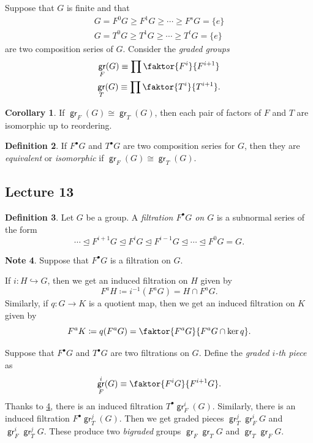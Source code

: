 \documentclass[10pt,letterpaper,cm]{nupset}
\theoremstyle{definition}
\newtheorem{definition}{Definition}[subsection]
\newtheorem{note}[definition]{Note}
\theoremstyle{theorem}
\newtheorem{corollary}[definition]{Corollary}
\theoremstyle{remark}
\newcommand{\1}{\mathbf{1}}
\newcommand{\0}{\vec 0}
\DeclareMathOperator{\gr}{\mathsf{gr}}
\begin{document}
\smallskip

Suppose that $G$ is finite and that 
\begin{gather*}
G = F^0G \geq F^1G \geq \cdots \geq F^sG = \{e\}  
\\ G = T^0G \geq T^1G \geq \cdots \geq T^tG = \{e\}
\end{gather*}
are two composition series of $G$. Consider the \textit{graded groups} 
\begin{gather*}
\gr_F(G) \equiv \prod \faktor{F^i}{F^{i+1}}
\\ \gr_T(G) \equiv \prod \faktor{T^i}{T^{i+1}}.
\end{gather*}

\begin{corollary}
 If $\gr_F(G) \cong \gr_T(G)$, then each pair of factors of $F$ and $T$ are isomorphic up to reordering. 
\end{corollary}

\begin{definition}
If $F^{\bullet}G$ and $T^{\bullet}G$ are two composition series for $G$, then they are \textit{equivalent} or \textit{isomorphic} if $\gr_F(G) \cong \gr_T(G)$.
\end{definition}

\subsection{Lecture 13}

\begin{definition}
Let $G$ be a group. A \textit{filtration $F^{\bullet}{G}$ on $G$} is a subnormal series of the form
\[
\cdots \unlhd F^{i+1}{G} \unlhd F^i{G} \unlhd F^{i-1}{G} \unlhd \cdots \unlhd F^0{G} = G
.\]
\end{definition}

\begin{note}\label{filt} Suppose that $F^{\bullet}G$ is a filtration on $G$.
\item If $i : H \hookrightarrow G$, then we get an induced filtration on $H$ given by $$F^a{H}\coloneqq  i^{-1}(F^aG) = H \cap F^a{G}.$$  Similarly, if $q: G \to K$ is a quotient map, then we get an induced filtration on $K$ given by $$F^aK\coloneqq  q(F^aG) = \faktor{F^aG}{F^aG \cap \ker{q}}.$$
\end{note}


Suppose that $F^{\bullet}G$ and $T^{\bullet}G$ are two filtrations on $G$. Define the \textit{graded $i$-th piece} as $$\gr_F^i(G) \equiv \faktor{F^iG}{F^{i+1}G}.$$ Thanks to \cref{filt}, there is an induced filtration $T^{\bullet}\gr_F^i(G)$. Similarly, there is an induced filtration $F^{\bullet}\gr_T^j(G)$. Then we get graded pieces $\gr_T^j\gr_F^iG$ and $\gr_F^i \gr_T^j G$. These produce two \textit{bigraded} groups $\gr_F\gr_TG$ and $\gr_T\gr_FG$.
\end{document}
